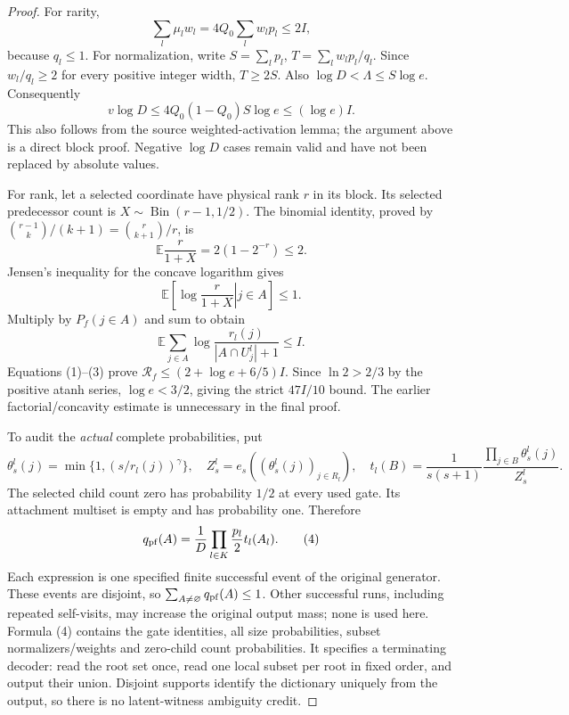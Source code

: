 \documentclass{article}
\begin{document}
\begin{proof}
For rarity,
\[
 \sum_l\mu_lw_l=4Q_0\sum_lw_lp_l\le2I,
\]
because $q_l\le1$. For normalization, write $S=\sum_lp_l$, $T=\sum_lw_lp_l/q_l$. Since $w_l/q_l\ge2$ for every positive integer width, $T\ge2S$. Also $\log D<\Lambda\le S\log e$. Consequently
\[
 v\log D\le4Q_0(1-Q_0)S\log e
 \le (\log e)I.
 \tag{2}
\]
This also follows from the source weighted-activation lemma; the argument above is a direct block proof. Negative $\log D$ cases remain valid and have not been replaced by absolute values.

For rank, let a selected coordinate have physical rank $r$ in its block. Its selected predecessor count is $X\sim\operatorname{Bin}(r-1,1/2)$. The binomial identity, proved by $\binom{r-1}{k}/(k+1)=\binom r{k+1}/r$, is
\[
 \mathbb E\frac{r}{1+X}=2(1-2^{-r})\le2.
\]
Jensen's inequality for the concave logarithm gives
\[
 \mathbb E\left[\left.\log\frac r{1+X}\right|j\in A\right]\le1.
\]
Multiply by $P_f(j\in A)$ and sum to obtain
\[
 \mathbb E\sum_{j\in A}\log\frac{r_l(j)}{|A\cap U_j^l|+1}\le I.
 \tag{3}
\]
Equations (1)--(3) prove $\mathcal R_f\le(2+\log e+6/5)I$. Since $\ln2>2/3$ by the positive atanh series, $\log e<3/2$, giving the strict $47I/10$ bound. The earlier factorial/concavity estimate is unnecessary in the final proof.

To audit the \emph{actual} complete probabilities, put
\[
 \theta_s^l(j)=\min\{1,(s/r_l(j))^\gamma\},
 \quad Z_s^l=e_s((\theta_s^l(j))_{j\in R_l}),
 \quad t_l(B)=\frac1{s(s+1)}\frac{\prod_{j\in B}\theta_s^l(j)}{Z_s^l}.
\]
The selected child count zero has probability $1/2$ at every used gate. Its attachment multiset is empty and has probability one. Therefore
\[
 q_{\rm pf}(A)=\frac1D\prod_{l\in K}\frac{p_l}{2}t_l(A_l).
 \tag{4}
\]
Each expression is one specified finite successful event of the original generator. These events are disjoint, so $\sum_{A\ne\varnothing}q_{\rm pf}(A)\le1$. Other successful runs, including repeated self-visits, may increase the original output mass; none is used here. Formula (4) contains the gate identities, all size probabilities, subset normalizers/weights and zero-child count probabilities. It specifies a terminating decoder: read the root set once, read one local subset per root in fixed order, and output their union. Disjoint supports identify the dictionary uniquely from the output, so there is no latent-witness ambiguity credit.


\end{proof}
\end{document}
